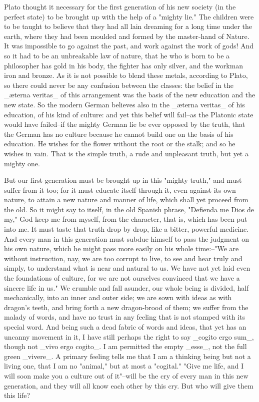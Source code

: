 Plato thought it necessary for the first generation of his new
society (in the perfect state) to be brought up with the help of a
"mighty lie." The children were to be taught to believe that they had
all lain dreaming for a long time under the earth, where they had
been moulded and formed by the master-hand of Nature. It was
impossible to go against the past, and work against the work of gods!
And so it had to be an unbreakable law of nature, that he who is born
to be a philosopher has gold in his body, the fighter has only
silver, and the workman iron and bronze. As it is not possible to
blend these metals, according to Plato, so there could never be any
confusion between the classes: the belief in the _æterna veritas_ of
this arrangement was the basis of the new education and the new
state. So the modern German believes also in the _æterna veritas_ of
his education, of his kind of culture: and yet this belief will
fail--as the Platonic state would have failed--if the mighty German
lie be ever opposed by the truth, that the German has no culture
because he cannot build one on the basis of his education. He wishes
for the flower without the root or the stalk; and so he wishes in
vain. That is the simple truth, a rude and unpleasant truth, but yet
a mighty one.

But our first generation must be brought up in this "mighty truth,"
and must suffer from it too; for it must educate itself through it,
even against its own nature, to attain a new nature and manner of
life, which shall yet proceed from the old. So it might say to
itself, in the old Spanish phrase, "Defienda me Dios de my," God keep
me from myself, from the character, that is, which has been put into
me. It must taste that truth drop by drop, like a bitter, powerful
medicine. And every man in this generation must subdue himself to
pass the judgment on his own nature, which he might pass more easily
on his whole time:--"We are without instruction, nay, we are too
corrupt to live, to see and hear truly and simply, to understand what
is near and natural to us. We have not yet laid even the foundations
of culture, for we are not ourselves convinced that we have a sincere
life in us." We crumble and fall asunder, our whole being is divided,
half mechanically, into an inner and outer side; we are sown with
ideas as with dragon's teeth, and bring forth a new dragon-brood of
them; we suffer from the malady of words, and have no trust in any
feeling that is not stamped with its special word. And being such a
dead fabric of words and ideas, that yet has an uncanny movement in
it, I have still perhaps the right to say _cogito ergo sum_, though
not _vivo ergo cogito_. I am permitted the empty _esse_, not the full
green _vivere_. A primary feeling tells me that I am a thinking being
but not a living one, that I am no "animal," but at most a "cogital."
"Give me life, and I will soon make you a culture out of it"--will be
the cry of every man in this new generation, and they will all know
each other by this cry. But who will give them this life?


